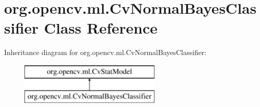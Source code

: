 \hypertarget{classorg_1_1opencv_1_1ml_1_1_cv_normal_bayes_classifier}{}\section{org.\+opencv.\+ml.\+Cv\+Normal\+Bayes\+Classifier Class Reference}
\label{classorg_1_1opencv_1_1ml_1_1_cv_normal_bayes_classifier}
Inheritance diagram for org.\+opencv.\+ml.\+Cv\+Normal\+Bayes\+Classifier\+:\begin{figure}[H]
\begin{center}
\leavevmode
\includegraphics[height=2.000000cm]{classorg_1_1opencv_1_1ml_1_1_cv_normal_bayes_classifier}
\end{center}
\end{figure}
